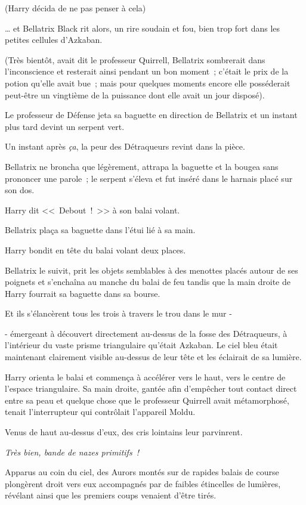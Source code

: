 (Harry décida de ne pas penser à cela)

… et Bellatrix Black rit alors, un rire soudain et fou, bien trop fort dans les petites cellules d'Azkaban.

(Très bientôt, avait dit le professeur Quirrell, Bellatrix sombrerait dans l'inconscience et resterait ainsi pendant un bon moment~; c'était le prix de la potion qu'elle avait bue~; mais pour quelques moments encore elle posséderait peut-être un vingtième de la puissance dont elle avait un jour disposé).

Le professeur de Défense jeta sa baguette en direction de Bellatrix et un instant plus tard devint un serpent vert.

Un instant après \emph{ça}, la peur des Détraqueurs revint dans la pièce.

Bellatrix ne broncha que légèrement, attrapa la baguette et la bougea sans prononcer une parole~; le serpent s'éleva et fut inséré dans le harnais placé sur son dos.

Harry dit <<~Debout~!~>> à son balai volant.

Bellatrix plaça sa baguette dans l'étui lié à sa main.

Harry bondit en tête du balai volant deux places.

Bellatrix le suivit, prit les objets semblables à des menottes placés autour de ses poignets et s'enchaîna au manche du balai de feu tandis que la main droite de Harry fourrait sa baguette dans sa bourse.

Et ils s'élancèrent tous les trois à travers le trou dans le mur -

- émergeant à découvert directement au-dessus de la fosse des Détraqueurs, à l'intérieur du vaste prisme triangulaire qu'était Azkaban. Le ciel bleu était maintenant clairement visible au-dessus de leur tête et les éclairait de sa lumière.

Harry orienta le balai et commença à accélérer vers le haut, vers le centre de l'espace triangulaire. Sa main droite, gantée afin d'empêcher tout contact direct entre sa peau et quelque chose que le professeur Quirrell avait métamorphosé, tenait l'interrupteur qui contrôlait l'appareil Moldu.

Venus de haut au-dessus d'eux, des cris lointains leur parvinrent.

\emph{Très bien, bande de nazes primitifs~!}

Apparus au coin du ciel, des Aurors montés sur de rapides balais de course plongèrent droit vers eux accompagnés par de faibles étincelles de lumières, révélant ainsi que les premiers coups venaient d'être tirés.

